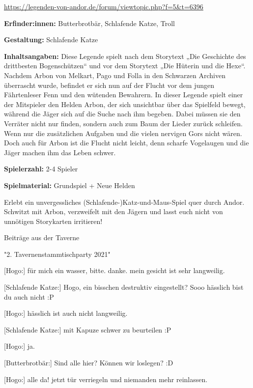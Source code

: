{\begin{center}
    \url{https://legenden-von-andor.de/forum/viewtopic.php?f=5&t=6396}
\end{center}


\textbf{Erfinder:innen:} Butterbrotbär, Schlafende Katze, Troll

\textbf{Gestaltung:} Schlafende Katze

\textbf{Inhaltsangaben:} Diese Legende spielt nach dem Storytext „Die Geschichte des drittbesten Bogenschützen“ und vor dem Storytext „Die Hüterin und die Hexe“. Nachdem Arbon von Melkart, Pago und Folla in den Schwarzen Archiven überrascht wurde, befindet er sich nun auf der Flucht vor dem jungen Fährtenleser Fenn und den wütenden Bewahrern. In dieser Legende spielt einer der Mitspieler den Helden Arbon, der sich unsichtbar über das Spielfeld bewegt, während die Jäger sich auf die Suche nach ihm begeben. Dabei müssen sie den Verräter nicht nur finden, sondern auch zum Baum der Lieder zurück schleifen. Wenn nur die zusätzlichen Aufgaben und die vielen nervigen Gors nicht wären. Doch auch für Arbon ist die Flucht nicht leicht, denn scharfe Vogelaugen und die Jäger machen ihm das Leben schwer.

\textbf{Spielerzahl:} 2-4 Spieler

\textbf{Spielmaterial:} Grundspiel + Neue Helden

Erlebt ein unvergessliches (Schlafende-)Katz-und-Maus-Spiel quer durch Andor. Schwitzt mit Arbon, verzweifelt mit den Jägern und lasst euch nicht von unnötigen Storykarten irritieren!

\begin{center}
    Beiträge aus der Taverne

    "2. Tavernenstammtischparty 2021"
\end{center}

[Hogo:] für mich ein wasser, bitte. 
danke. mein gesicht ist sehr langweilig.

[Schlafende Katze:] Hogo, ein bisschen destruktiv eingestellt? Sooo hässlich bist du auch nicht :P

[Hogo:] hässlich ist auch nicht langweilig.

[Schlafende Katze:] mit Kapuze schwer zu beurteilen :P

[Hogo:] ja.

[Butterbrotbär:] Sind alle hier? Können wir loslegen? :D

[Hogo:] alle da! jetzt tür verriegeln und niemanden mehr reinlassen.

}
